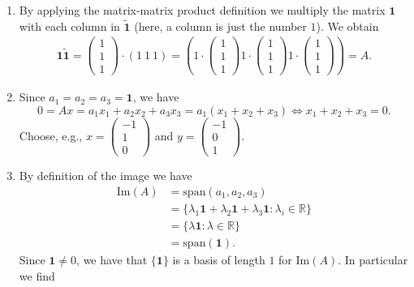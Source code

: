 {\color{solution}
\begin{enumerate}
	\item 
	By applying the matrix-matrix product definition we multiply the matrix $\mathbf{1}$  with each column in $\tilde{\mathbf{1}}$ (here, a column is just the number $1$). We obtain
	\begin{align*}
\mathbf{1}\tilde{\mathbf{1}}  = \begin{pmatrix}1\\1\\1\end{pmatrix} \cdot (1~1~1) =	\left( 	1\cdot  \begin{pmatrix}1\\1\\1\end{pmatrix} 	1\cdot  \begin{pmatrix}1\\1\\1\end{pmatrix} 	1\cdot  \begin{pmatrix}1\\1\\1\end{pmatrix}\right) = A.
	\end{align*}
	\item 
	Since $a_1 = a_2 = a_3=\mathbf{1}$, we have 
	$$
	0 = A x = a_1x_1 + a_2x_2 +a_3x_3 = a_1 (x_1+x_2+x_3) \Leftrightarrow x_1+x_2+x_3 = 0.
	$$
	Choose, e.g., $x= \begin{pmatrix}
	-1\\1\\0
	\end{pmatrix}$ and $y= \begin{pmatrix}
	-1\\0\\1
	\end{pmatrix}.$
	\item 
	By definition of the image we have
	\begin{align*}
	\text{Im}(A)
	&=\text{span}(a_1,a_2,a_3)\\
	&=\{\lambda_1\mathbf{1}+\lambda_2\mathbf{1}+\lambda_3\mathbf{1}\colon \lambda_i \in \mathbb{R} \}\\
	&=\{\lambda \mathbf{1}\colon \lambda \in \mathbb{R} \} \\
	&=\text{span}(\mathbf{1}).
	\end{align*} 
	Since $\mathbf{1} \neq 0$, we have that $\{\mathbf{1}\}$ is a basis of length $1$ for $\text{Im}(A)$. In particular we find

\end{enumerate}}
